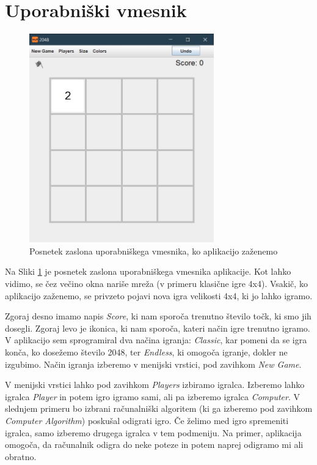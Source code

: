 \documentclass{article}
\begin{document}
\section{Uporabniški vmesnik}

\begin{figure}[ht!]
\centering
\includegraphics[width=8cm]{ui.jpg}
\caption{Posnetek zaslona uporabniškega vmesnika, ko aplikacijo zaženemo}
\label{ui}
\end{figure}

Na Sliki \ref{ui} je posnetek zaslona uporabniškega vmesnika aplikacije. Kot lahko vidimo, se čez večino okna nariše mreža (v primeru klasične igre 4x4). Vsakič, ko aplikacijo zaženemo, se privzeto pojavi nova igra velikosti 4x4, ki jo lahko igramo. 

Zgoraj desno imamo napis \emph{Score}, ki nam sporoča trenutno število točk, ki smo jih dosegli. Zgoraj levo je ikonica, ki nam sporoča, kateri način igre trenutno igramo. V aplikacijo sem sprogramiral dva načina igranja: \emph{Classic}, kar pomeni da se igra konča, ko dosežemo število 2048, ter \emph{Endless}, ki omogoča igranje, dokler ne izgubimo. Način igranja izberemo v menijski vrstici, pod zavihkom \emph{New Game}.

V menijski vrstici lahko pod zavihkom \emph{Players} izbiramo igralca. Izberemo lahko igralca \emph{Player} in potem igro igramo sami, ali pa izberemo igralca \emph{Computer}. V slednjem primeru bo izbrani računalniški algoritem (ki ga izberemo pod zavihkom \emph{Computer Algorithm}) poskušal odigrati igro. Če želimo med igro spremeniti igralca, samo izberemo drugega igralca v tem podmeniju. Na primer, aplikacija omogoča, da računalnik odigra do neke poteze in potem naprej odigramo mi ali obratno.
\end{document}
